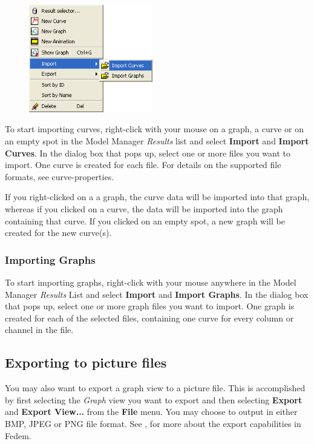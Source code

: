 \begin{figure}
  \vspace{-10mm}
  \includegraphics[width=0.48\textwidth]{Figures/7-CurveImport}
\end{figure}

To start importing curves, right-click with your mouse on a graph, a curve
or on an empty spot in the Model Manager {\sl Results} list and select
\textbf{Import} and \textbf{Import Curves}. In the dialog box that pops
up, select one or more files you want to import. One curve is created
for each file. For details on the supported file formats, see
              {curve-properties}.

If you right-clicked on a a graph, the curve data will be imported into
that graph, whereas if you clicked on a curve, the data will be imported
into the graph containing that curve. If you clicked on an empty spot, a
new graph will be created for the new curve(s).

\subsubsection{Importing Graphs}

To start importing graphs, right-click with your mouse anywhere in the
Model Manager {\sl Results} List and select \textbf{Import} and
\textbf{Import Graphs}. In the dialog box that pops up, select one or more graph
files you want to import. One graph is created for each of the selected files,
containing one curve for every column or channel in the file.


\subsection{Exporting to picture files}

You may also want to export a graph view to a picture file.
This is accomplished by first selecting the {\sl Graph} view you want to export
and then selecting \textbf{Export} and \textbf{Export View...} from the
\textbf{File} menu. You may choose to output in either BMP, JPEG or PNG file
format. See ,
for more about the export capabilities in Fedem.


